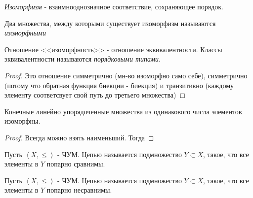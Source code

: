 
\begin{definition} \thmslashn

	\textit{Изоморфизм} - взаимнооднозначное соответствие, сохраняющее порядок.
	
	Два множества, между которыми существует изоморфизм называются \textit{изоморфными}
\end{definition}

\begin{lemma} \thmslashn

	Отношение <<изоморфность>> - отношение эквивалентности. Классы эквивалентности называются \textit{порядковыми типами}.
	\begin{proof} \thmslashn
		
		Это отношение симметрично (мн-во изоморфно само себе), симметрично (потому что обратная функция биекции - биекция) и транзитивно (каждому элементу соответсвует свой путь до третьего множества)
	\end{proof}
\end{lemma}

\begin{theorem} \thmslashn

	Конечные линейно упорядоченные множества из одинакового числа элементов изоморфны.
	\begin{proof} \thmslashn
	
		Всегда можно взять наименьший. Тогда 
	\end{proof}
\end{theorem}

\begin{definition} \thmslashn 

    Пусть $\left<X, \le\right>$ - ЧУМ. Цепью называется подмножество $Y \subset X$, такое, что все элементы в $Y$ попарно сравнимы.
\end{definition}
\begin{definition} \thmslashn 

    Пусть $\left<X, \le\right>$ - ЧУМ. Цепью называется подмножество $Y \subset X$, такое, что все элементы в $Y$ попарно несравнимы.
\end{definition}

